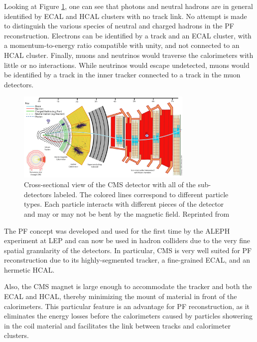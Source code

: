 Looking at Figure \ref{fig:cmsslice}, one can see that photons and neutral hadrons are in general identified by ECAL and HCAL clusters with no track link. No attempt is made to distinguish the various species of neutral and charged hadrons in the PF reconstruction. Electrons can be identified by a track and an ECAL cluster, with a momentum-to-energy ratio compatible with unity, and not connected to an HCAL cluster. Finally, muons and neutrinos would traverse the calorimeters with little or no interactions. While neutrinos would escape undetected, muons would be identified by a track in the inner tracker connected to a track in the muon detectors.

 \begin{figure}[h]
  	\label{fig:cmsslice}
 	\centering
 	\includegraphics[width=0.75\textwidth]{figures/image005.png}
 	\singlespace
 	\caption{Cross-sectional view of the CMS detector with all of the sub-detectors labeled. The colored lines correspond to different particle types. Each particle interacts with different pieces of the detector and may or may not be bent by the magnetic field. Reprinted from \cite{CMSSlice}}
 \end{figure}

The PF concept was developed and used for the first time by the ALEPH experiment at LEP\cite{BUSKULIC1995481} and can now be used in hadron colliders due to the very fine spatial granularity of the detectors. In particular, CMS is very well suited for PF reconstruction due to its highly-segmented tracker,  a fine-grained ECAL, and an hermetic HCAL.

Also, the CMS magnet is large enough to accommodate the tracker and both the ECAL and HCAL, thereby minimizing the mount of material in front of the calorimeters. This particular feature is an advantage for PF reconstruction, as it eliminates the energy losses before the calorimeters caused by particles showering in the coil material and facilitates the link between tracks and calorimeter clusters.

